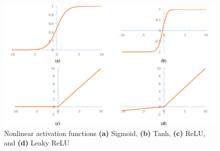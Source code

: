 \begin{figure}
    \centerline{\includegraphics[width=1\columnwidth]{03-neural-networks-in-tumor-detection/figures/nonlinear-activation-functions.png}}
    \caption{Nonlinear activation functions \textbf{(a)} Sigmoid, \textbf{(b)} Tanh, \textbf{(c)} ReLU, and \textbf{(d)} Leaky ReLU \cite{yang2018modified}}
    \label{figure:nonlinear-activation-functions}
\end{figure}